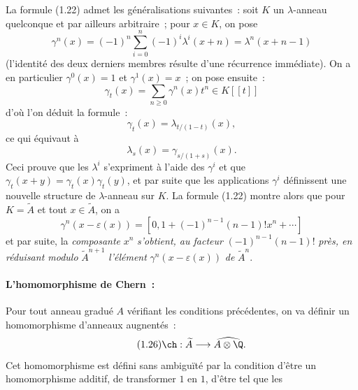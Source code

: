 La
formule (1.22) admet les généralisations suivantes~: soit $K$ un $\lambda$-anneau quelconque et par ailleurs arbitraire~; pour $x\in K$, on pose
\begin{equation}\tag{1.23}
\gamma^n(x)=(-1)^n\sum_{i=0}^n(-1)^i\lambda^i(x+n)=\lambda^n(x+n-1)
\end{equation}
(l'identité des deux derniers membres résulte d'une récurrence immédiate). On a en particulier $\gamma^0(x)=1$ et $\gamma^1(x)=x$~; on pose ensuite~:
\begin{equation}\tag{1.24}
\gamma_t(x)=\sum_{n\geq0}\gamma^n(x)t^n\in K[[t]]
\end{equation}
d'où l'on déduit la formule~:
\begin{equation}\tag{1.25}
\gamma_t(x)=\lambda_{t/(1-t)}(x),
\end{equation}
ce qui équivaut à
\begin{equation}\tag{1.25 bis}
\lambda_s(x)=\gamma_{s/(1+s)}(x).
\end{equation}
Ceci prouve que les $\lambda^i$ s'expriment à l'aide des $\gamma^i$ et que $\gamma_t(x+y)=\gamma_t(x)\gamma_t(y)$, et par suite que les applications $\gamma^i$ définissent une nouvelle structure de $\lambda$-anneau sur $K$. La formule (1.22) montre alors que pour $K=\widetilde A$ et tout $x\in\widetilde A$, on a
\begin{equation}\tag{1.22 bis}
\gamma^n(x-\varepsilon(x))=[0,1+(-1)^{n-1}(n-1)!x^n+\cdots]
\end{equation}
et par suite, la \emph{composante} $x^n$ \emph{s'obtient, au facteur} $(-1)^{n-1}(n-1)!$ \emph{près, en réduisant modulo} $\widetilde A^{n+1}$ \emph{l'élément} $\gamma^n(x-\varepsilon(x))$ \emph{de} $\widetilde A^n$.

\paragraph{L'homomorphisme de Chern~:}
Pour tout anneau gradué $A$ vérifiant les conditions précédentes, on va définir un homomorphisme d'anneaux augnentés~:
\begin{equation}\tag{1.26}
\ch:\widetilde A\longrightarrow \widehat{A\otimes\Q}.
\end{equation}
Cet homomorphisme est défini sans ambiguïté par la condition d'être un homomorphisme additif, de transformer $1$ en $1$, d'être tel que les
